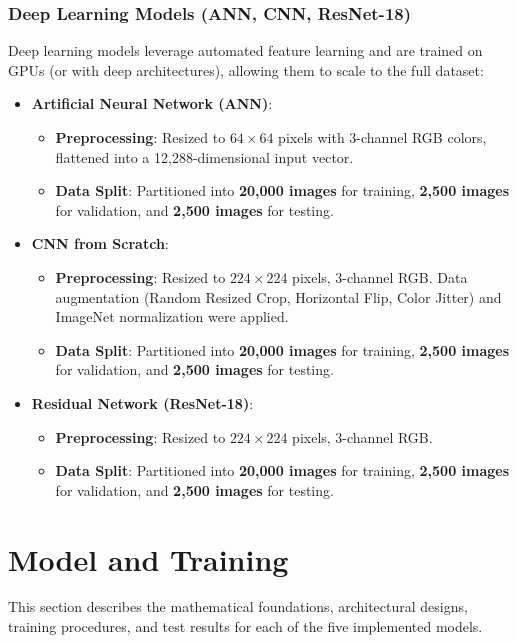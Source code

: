 \documentclass[12pt,a4paper]{article}
\begin{document}
\subsubsection{Deep Learning Models (ANN, CNN, ResNet-18)}
Deep learning models leverage automated feature learning and are trained on GPUs (or with deep architectures), allowing them to scale to the full dataset:
\begin{itemize}
    \item \textbf{Artificial Neural Network (ANN)}:
    \begin{itemize}
        \item \textbf{Preprocessing}: Resized to $64 \times 64$ pixels with 3-channel RGB colors, flattened into a 12,288-dimensional input vector.
        \item \textbf{Data Split}: Partitioned into \textbf{20,000 images} for training, \textbf{2,500 images} for validation, and \textbf{2,500 images} for testing.
    \end{itemize}
    \item \textbf{CNN from Scratch}:
    \begin{itemize}
        \item \textbf{Preprocessing}: Resized to $224 \times 224$ pixels, 3-channel RGB. Data augmentation (Random Resized Crop, Horizontal Flip, Color Jitter) and ImageNet normalization were applied.
        \item \textbf{Data Split}: Partitioned into \textbf{20,000 images} for training, \textbf{2,500 images} for validation, and \textbf{2,500 images} for testing.
    \end{itemize}
    \item \textbf{Residual Network (ResNet-18)}:
    \begin{itemize}
        \item \textbf{Preprocessing}: Resized to $224 \times 224$ pixels, 3-channel RGB.
        \item \textbf{Data Split}: Partitioned into \textbf{20,000 images} for training, \textbf{2,500 images} for validation, and \textbf{2,500 images} for testing.
    \end{itemize}
\end{itemize}

\section{Model and Training}
This section describes the mathematical foundations, architectural designs, training procedures, and test results for each of the five implemented models.
\end{document}
